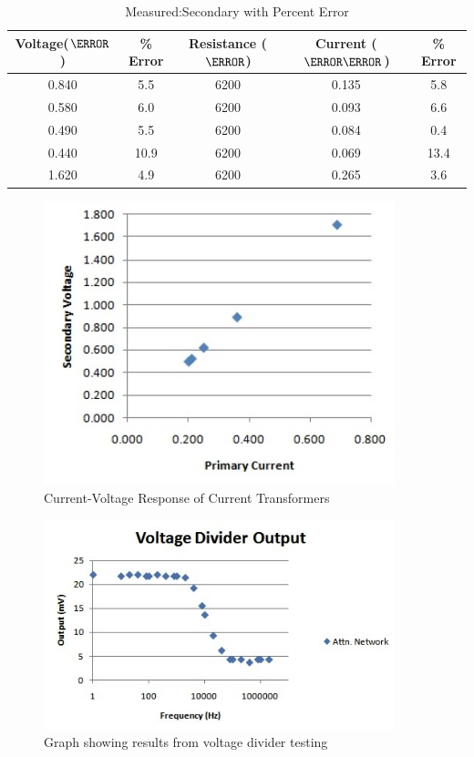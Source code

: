 \begin{table}[htdp]
\caption{Measured:Secondary with Percent Error}
\begin{center}
\begin{tabular}{|c|c|c|c|c|} \hline
Voltage($\volt$) & \% Error & Resistance ($\ohm$) & Current ($\milli\ampere$) & \% Error \\ \hline
0.840 & 5.5 & 6200 & 0.135 & 5.8 \\ \hline
0.580 & 6.0 & 6200 & 0.093 & 6.6 \\ \hline
0.490 & 5.5 & 6200 & 0.084 & 0.4 \\ \hline
0.440 & 10.9 &6200 & 0.069 & 13.4 \\ \hline
1.620 & 4.9 & 6200 & 0.265 & 3.6 \\ \hline
\end{tabular}
\end{center}
\label{tab:measured_secondaryPercentError}
\end{table}%

\begin{figure}[htbp]
\begin{center}
\includegraphics[width=4in]{includes/NJGraph2}
\caption{Current-Voltage Response of Current Transformers}
\label{fig:current_transformers_iv_response}
\end{center}
\end{figure}

\begin{figure}[htbp]
\begin{center}
\includegraphics[width=4in]{includes/NJVoltDivOutput}
\caption{Graph showing results from voltage divider testing}
\label{fig:voltage_divider_testing}
\end{center}
\end{figure}

